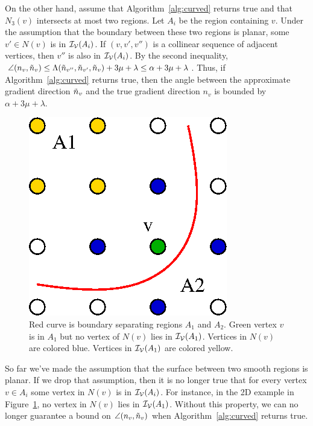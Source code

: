 On the other hand, assume that Algorithm~\ref{alg:curved} returns true
and that $N_3(v)$ intersects at most two regions.
Let $A_i$ be the region containing $v$.
Under the assumption that the boundary between these two regions is planar,
some $v' \in N(v)$ is in $\mathcal{I_V}(A_i)$.
If $(v,v',v'')$ is a collinear sequence of adjacent vertices,
then $v''$ is also in $\mathcal{I_V}(A_i)$.
By the second inequality,
$\angle(n_v,\tilde{n}_v) \le \Lambda(\tilde{n}_{v''},\tilde{n}_{v'},\tilde{n}_v) + 3 \mu + \lambda
\le \alpha + 3 \mu + \lambda$.
Thus, if Algorithm~\ref{alg:curved} returns true,
then the angle between the approximate gradient direction $\tilde{n}_v$
and the true gradient direction $n_v$
is bounded by $\alpha + 3\mu + \lambda$.
 \begin{figure}
	\centering
    \includegraphics[width=0.5\linewidth]{images/curved_boundary.eps}
    \caption{Red curve is boundary separating regions $A_1$ and $A_2$.
        Green vertex $v$ is in $A_1$ but 
        no vertex of $N(v)$ lies in $\mathcal{I_V}(A_1)$.
        Vertices in $N(v)$ are colored blue.
        Vertices in $\mathcal{I_V}(A_1)$ are colored yellow.}
    \label{fig:curved_boundary}
    
 \end{figure}
    

So far we've made the assumption that the surface
between two smooth regions is planar.
If we drop that assumption, then it is no longer true
that for every vertex $v \in A_i$ some vertex in $N(v)$ is in $\mathcal{I_V}(A_i)$.
For instance, in the 2D example in Figure~\ref{fig:curved_boundary},
no vertex in $N(v)$ lies in $\mathcal{I_V}(A_1)$.
Without this property, we can no longer guarantee a bound
on $\angle(n_v, \tilde{n}_v)$ when Algorithm~\ref{alg:curved} returns true.

